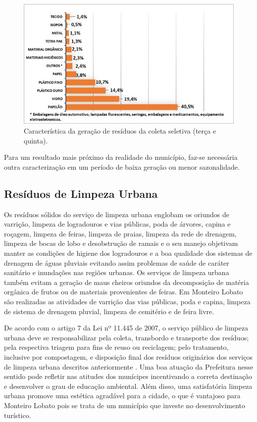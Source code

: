\begin{figure}
	\centering
	\includegraphics[width=0.75\linewidth]{produtos/prodtres/image050}
	\caption{Característica da geração de resíduos da coleta seletiva (terça e quinta).}
	\label{fig:image050}
\end{figure}


Para um resultado mais próximo da realidade do município, faz-se necessária outra caracterização em um período de baixa geração ou menor sazonalidade.

\subsection{Resíduos de Limpeza Urbana}

Os resíduos sólidos do serviço de limpeza urbana englobam os oriundos de varrição, limpeza de logradouros e vias públicas, poda de árvores, capina e roçagem, limpeza de feiras, limpeza de praias, limpeza da rede de drenagem, limpeza de bocas de lobo e desobstrução de ramais \cite{brasil:12305, brasil:11445, ibam:2001} e o seu manejo objetivam manter as condições de higiene dos logradouros e a boa qualidade dos sistemas de drenagem de águas pluviais evitando assim problemas de saúde de caráter sanitário e inundações nas regiões urbanas. Os serviços de limpeza urbana também evitam a geração de maus cheiros oriundos da decomposição de matéria orgânica de frutos ou de materiais provenientes de feiras. Em Monteiro Lobato são realizadas as atividades de varrição das vias públicas, poda e capina, limpeza de sistema de drenagem pluvial, limpeza de cemitério e de feira livre.

De acordo com o artigo 7 da Lei nº 11.445 de 2007, o serviço público de limpeza urbana deve se responsabilizar pela coleta, transbordo e transporte dos resíduos; pela respectiva triagem para fins de reuso ou reciclagem; pelo tratamento, inclusive por compostagem, e disposição final dos resíduos originários dos serviços de limpeza urbana descritos anteriormente \cite{brasil:11445}. Uma boa atuação da Prefeitura nesse sentido pode refletir nas atitudes dos munícipes incentivando a correta destinação e desenvolver o grau de educação ambiental. Além disso, uma satisfatória limpeza urbana promove uma estética agradável para a cidade, o que é vantajoso para Monteiro Lobato pois se trata de um município que investe no desenvolvimento turístico.

